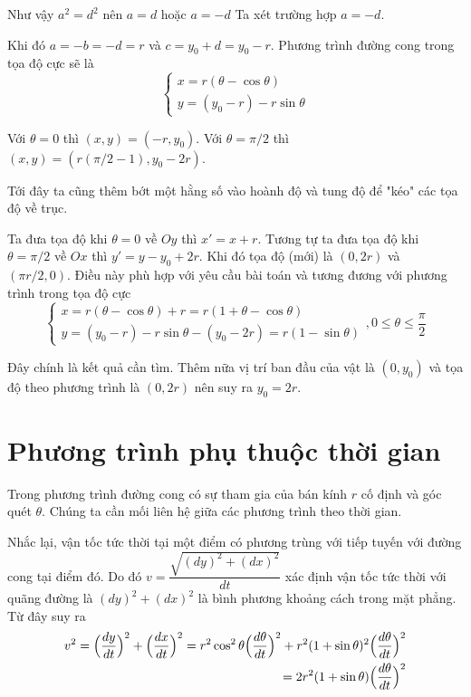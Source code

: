 Như vậy $a^2 = d^2$ nên $a = d$ hoặc $a = -d$ Ta xét trường hợp $a = -d$.

Khi đó $a = -b = -d = r$ và $c = y_0 + d = y_0 - r$. Phương trình đường cong trong tọa độ cực sẽ là 
\begin{equation*}
    \begin{cases}
        x = r (\theta - \cos\theta) \\
        y = (y_0 - r) - r \sin\theta
    \end{cases}
\end{equation*}

Với $\theta = 0$ thì $(x, y) = (-r, y_0)$. Với $\theta = \pi / 2$ thì $(x, y) = (r (\pi / 2 - 1), y_0 - 2r)$.

Tới đây ta cũng thêm bớt một hằng số vào hoành độ và tung độ để "kéo" các tọa độ về trục.

Ta đưa tọa độ khi $\theta = 0$ về $Oy$ thì $x' = x + r$. Tương tự ta đưa tọa độ khi $\theta = \pi / 2$ về $Ox$ thì $y' = y - y_0 + 2r$. Khi đó tọa độ (mới) là $(0, 2r)$ và $(\pi r / 2, 0)$. Điều này phù hợp với yêu cầu bài toán và tương đương với phương trình trong tọa độ cực 
\begin{equation}
    \begin{cases}
        x = r (\theta - \cos\theta) + r = r (1 + \theta - \cos\theta) \\
        y = (y_0 - r) - r \sin\theta - (y_0 - 2r) = r (1 - \sin\theta)
    \end{cases}, 0 \leqslant \theta \leqslant \frac{\pi}{2}
\end{equation}

Đây chính là kết quả cần tìm. Thêm nữa vị trí ban đầu của vật là $(0, y_0)$ và tọa độ theo phương trình là $(0, 2r)$ nên suy ra $y_0 = 2r$.

\section*{Phương trình phụ thuộc thời gian}

Trong phương trình đường cong có sự tham gia của bán kính $r$ cố định và góc quét $\theta$. Chúng ta cần mối liên hệ giữa các phương trình theo thời gian.

Nhắc lại, vận tốc tức thời tại một điểm có phương trùng với tiếp tuyến với đường cong tại điểm đó. Do đó $v = \dfrac{\sqrt{(dy)^2 + (dx)^2}}{dt}$ xác định vận tốc tức thời với quãng đường là $(dy)^2 + (dx)^2$ là bình phương khoảng cách trong mặt phẳng. Từ đây suy ra
\begin{align*}
    v^2 = \Bigl(\frac{dy}{dt}\Bigr)^2 + \Bigl(\frac{dx}{dt}\Bigr)^2 = r^2 \cos^2 \theta \Bigl( \frac{d \theta}{dt} \Bigr)^2 + r^2 (1 + \sin \theta)^2 \Bigl( \frac{d \theta}{dt} \Bigr)^2 \\ = 2 r^2 (1 + \sin \theta) \Bigl( \frac{d \theta}{dt} \Bigr)^2
\end{align*}

